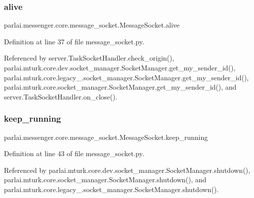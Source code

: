 \subsubsection{\texorpdfstring{alive}{alive}}
{\footnotesize\ttfamily parlai.\+messenger.\+core.\+message\+\_\+socket.\+Message\+Socket.\+alive}



Definition at line 37 of file message\+\_\+socket.\+py.



Referenced by server.\+Task\+Socket\+Handler.\+check\+\_\+origin(), parlai.\+mturk.\+core.\+dev.\+socket\+\_\+manager.\+Socket\+Manager.\+get\+\_\+my\+\_\+sender\+\_\+id(), parlai.\+mturk.\+core.\+legacy\+\_.\+socket\+\_\+manager.\+Socket\+Manager.\+get\+\_\+my\+\_\+sender\+\_\+id(), parlai.\+mturk.\+core.\+socket\+\_\+manager.\+Socket\+Manager.\+get\+\_\+my\+\_\+sender\+\_\+id(), and server.\+Task\+Socket\+Handler.\+on\+\_\+close().

\mbox{\label{classparlai_1_1messenger_1_1core_1_1message__socket_1_1MessageSocket_a5a966f25c782fd0310fd1cf753f41ecb}} 
\subsubsection{\texorpdfstring{keep\+\_\+running}{keep\_running}}
{\footnotesize\ttfamily parlai.\+messenger.\+core.\+message\+\_\+socket.\+Message\+Socket.\+keep\+\_\+running}



Definition at line 43 of file message\+\_\+socket.\+py.



Referenced by parlai.\+mturk.\+core.\+dev.\+socket\+\_\+manager.\+Socket\+Manager.\+shutdown(), parlai.\+mturk.\+core.\+socket\+\_\+manager.\+Socket\+Manager.\+shutdown(), and parlai.\+mturk.\+core.\+legacy\+\_.\+socket\+\_\+manager.\+Socket\+Manager.\+shutdown().

\mbox{\label{classparlai_1_1messenger_1_1core_1_1message__socket_1_1MessageSocket_ad7fbb8abac890b60ecab357727f7921b}} 
